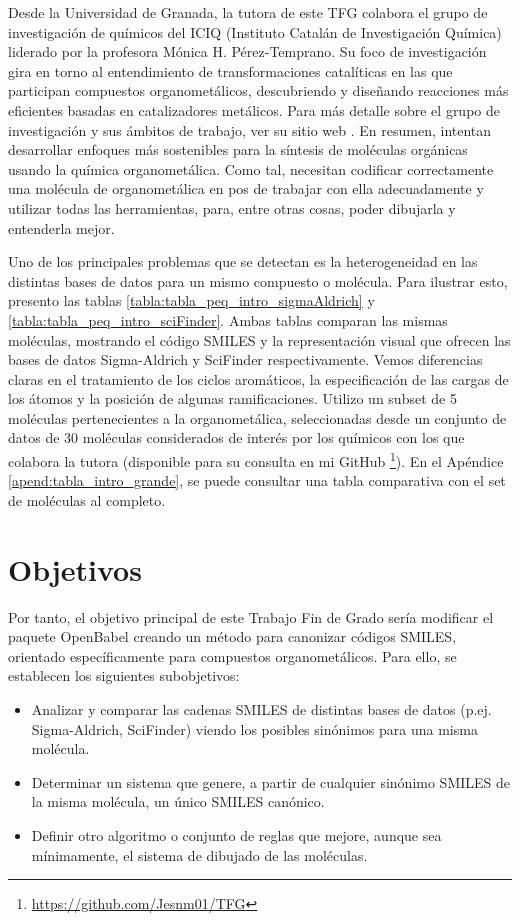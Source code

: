 Desde la Universidad de Granada, la tutora de este TFG colabora el grupo de investigación de químicos del ICIQ (Instituto Catalán de Investigación Química) liderado por la profesora Mónica H. Pérez-Temprano. Su foco de investigación gira en torno al entendimiento de transformaciones catalíticas en las que participan compuestos organometálicos, descubriendo y diseñando reacciones más eficientes basadas en catalizadores metálicos. Para más detalle sobre el grupo de investigación y sus ámbitos de trabajo, ver su sitio web \cite{ICIQ}. En resumen, intentan desarrollar enfoques más sostenibles para la síntesis de moléculas orgánicas usando la química organometálica. Como tal, necesitan codificar correctamente una molécula de organometálica en pos de trabajar con ella adecuadamente y utilizar todas las herramientas, para, entre otras cosas, poder dibujarla y entenderla mejor.


Uno de los principales problemas que se detectan es la heterogeneidad en las distintas bases de datos para un mismo compuesto o molécula. Para ilustrar esto, presento las tablas \ref{tabla:tabla_peq_intro_sigmaAldrich} y \ref{tabla:tabla_peq_intro_sciFinder}. Ambas tablas comparan las mismas moléculas, mostrando el código SMILES y la representación visual que ofrecen las bases de datos Sigma-Aldrich y SciFinder respectivamente. Vemos diferencias claras en el tratamiento de los ciclos aromáticos, la especificación de las cargas de los átomos y la posición de algunas ramificaciones. Utilizo un subset de 5 moléculas pertenecientes a la organometálica, seleccionadas desde un conjunto de datos de 30 moléculas considerados de interés por los químicos con los que colabora la tutora (disponible para su consulta en mi GitHub \footnote{\url{https://github.com/Jesnm01/TFG}}). En el Apéndice \ref{apend:tabla_intro_grande}, se puede consultar una tabla comparativa con el set de moléculas al completo. 














\section{Objetivos}
Por tanto, el objetivo principal de este Trabajo Fin de Grado sería modificar el paquete OpenBabel creando un método para canonizar códigos SMILES, orientado específicamente para compuestos organometálicos. Para ello, se establecen los siguientes subobjetivos:
\begin{itemize}
    \item Analizar y comparar las cadenas SMILES de distintas bases de datos (p.ej. Sigma-Aldrich, SciFinder) viendo los posibles sinónimos para una misma molécula.
    \item Determinar un sistema que genere, a partir de cualquier sinónimo SMILES de la misma molécula, un único SMILES canónico.
    \item Definir otro algoritmo o conjunto de reglas que mejore, aunque sea mínimamente, el sistema de dibujado de las moléculas.
\end{itemize} 

